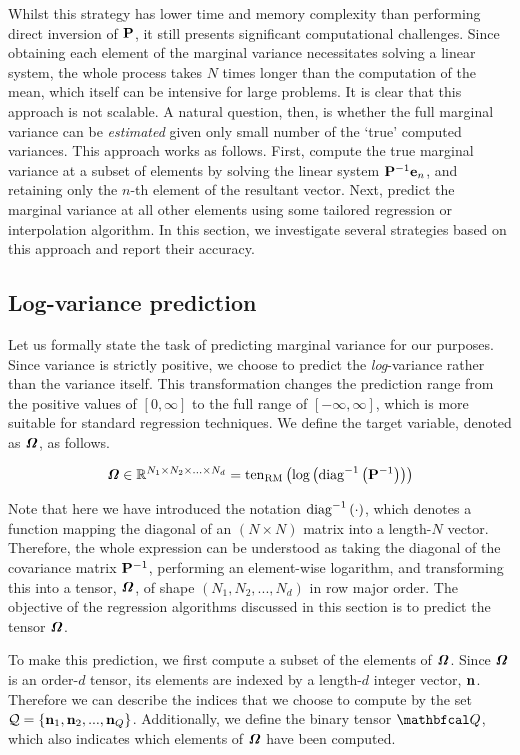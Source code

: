     
Whilst this strategy has lower time and memory complexity than performing direct inversion of $\mathbf{P}$, it still presents significant computational challenges. Since obtaining each element of the marginal variance necessitates solving a linear system, the whole process takes $N$ times longer than the computation of the mean, which itself can be intensive for large problems. It is clear that this approach is not scalable. A natural question, then, is whether the full marginal variance can be \textit{estimated} given only small number of the `true' computed variances.  This approach works as follows. First, compute the true marginal variance at a subset of elements by solving the linear system $\mathbf{P}^{-1}\mathbf{e}_n$, and retaining only the $n$-th element of the resultant vector. Next, predict the marginal variance at all other elements using some tailored regression or interpolation algorithm. In this section, we investigate several strategies based on this approach and report their accuracy. 


\subsection{Log-variance prediction}


Let us formally state the task of predicting marginal variance for our purposes. Since variance is strictly positive, we choose to predict the \textit{log}-variance rather than the variance itself. This transformation changes the prediction range from the positive values of $[0, \infty]$ to the full range of $[-\infty, \infty]$, which is more suitable for standard regression techniques. We define the target variable, denoted as $\bm{\mathit{\Omega}}$, as follows.

\begin{equation}
    \bm{\mathit{\Omega}} \in \mathbb{R}^{N_1 \times N_2 \times ... \times N_d} = \text{\textup{ten}}_{\text{\textup{RM}}}\left(\text{log}\left(\text{\textup{diag}}^{-1}\left(\mathbf{P}^{-1}\right)\right)\right)
\end{equation}

Note that here we have introduced the notation $\text{\textup{diag}}^{-1}\left(\cdot\right)$, which denotes a function mapping the diagonal of an $(N \times N)$ matrix into a length-$N$ vector. Therefore, the whole expression can be understood as taking the diagonal of the covariance matrix $\mathbf{P}^{-1}$, performing an element-wise logarithm, and transforming this into a tensor, $\bm{\mathit{\Omega}}$,  of shape $(N_1, N_2, ..., N_d)$ in row major order. The objective of the regression algorithms discussed in this section is to predict the tensor $\bm{\mathit{\Omega}}$.

To make this prediction, we first compute a subset of the elements of $\bm{\mathit{\Omega}}$. Since $\bm{\mathit{\Omega}}$ is an order-$d$ tensor, its elements are indexed by a length-$d$ integer vector, $\mathbf{n}$. Therefore we can describe the indices that we choose to compute by the set $\mathcal{Q} = \{\mathbf{n}_1, \mathbf{n}_2, ..., \mathbf{n}_Q \}$. Additionally, we define the binary tensor $\Qt$, which also indicates which elements of $\bm{\mathit{\Omega}}$ have been computed. 

